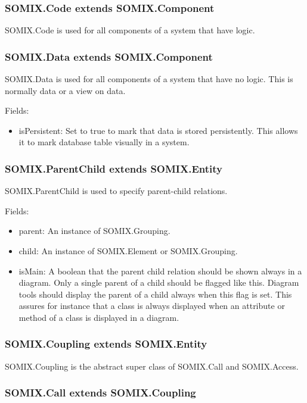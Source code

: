 \documentclass[preprint,12pt]{elsarticle}
\begin{document}
\subsubsection{SOMIX.Code extends SOMIX.Component}

SOMIX.Code is used for all components of a system that have logic.

\subsubsection{SOMIX.Data extends SOMIX.Component}

SOMIX.Data is used for all components of a system that have no logic. This is normally data or a view on data.

Fields:
\begin{itemize}
\item isPersistent: Set to true to mark that data is stored persistently. This allows it to mark database table visually in a system.
\end{itemize}

\subsubsection{SOMIX.ParentChild extends SOMIX.Entity}

SOMIX.ParentChild is used to specify parent-child relations.

Fields:
\begin{itemize}
\item parent: An instance of SOMIX.Grouping.
\item child: An instance of SOMIX.Element or SOMIX.Grouping.
\item isMain: A boolean that the parent child relation should be shown always in a diagram. Only a single parent of a child should be flagged like this. Diagram tools should display the parent of a child always when this flag is set. This assures for instance that a class is always displayed when an attribute or method of a class is displayed in a diagram.
\end{itemize}


\subsubsection{SOMIX.Coupling extends SOMIX.Entity}

SOMIX.Coupling is the abstract super class of SOMIX.Call and SOMIX.Access.

\subsubsection{SOMIX.Call extends SOMIX.Coupling}
\end{document}
